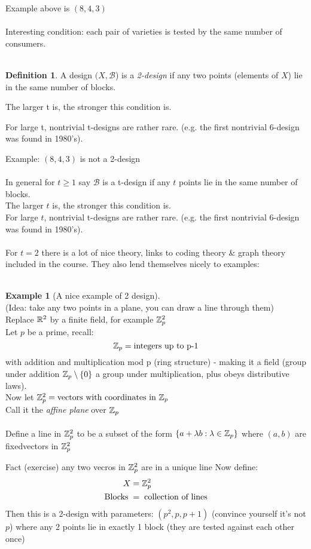 \documentclass[]{article}
\theoremstyle{definition}
\newtheorem*{defn}{Definition}
\newtheorem*{exmp}{Example}
\theoremstyle{remark}
\numberwithin{equation}{section}
\begin{document}
		Example above is $(8,4,3)$\\
		\\
		Interesting condition: each pair of varieties is tested by the same number of consumers.\\
		\\
		\begin{defn}
		A design $(X, \mathscr{B}$) is a \emph{2-design} if any two points (elements of $X$) lie in the same number of blocks.

		The larger t is, the stronger this condition is.

		For large t, nontrivial t-designs are rather rare.
		(e.g. the first nontrivial 6-design was found in 1980’s).
		\end{defn}
		Example: $(8,4,3)$ is not a 2-design\\
		\\
		In general for $t \geq 1$ say $\mathscr{B}$ is a t-design if any $t$ points lie in the same number of blocks.\\
		The larger $t$ is, the stronger this condition is.\\
		For large $t$, nontrivial t-designs are rather rare. (e.g. the first nontrivial 6-design was found in 1980’s).\\
		\\
		For $t = 2$ there is a lot of nice theory, links to coding theory \& graph theory included in the course. They also lend themselves nicely to examples:\\
		\\
		\begin{exmp}[A nice example of 2 design]\hfill\\
		(Idea: take any two points in a plane, you can draw a line through them)\\
		Replace $\mathbb R^2$ by a finite field, for example $\mathbb{Z}_p^2$\\
		Let $p$ be a prime, recall: \\
		\[
			\mathbb{Z}_p = \text{integers up to p-1}
		\]
		with addition and multiplication mod p (ring structure) - making it a field (group under addition $\mathbb{Z}_p\setminus\{0\}$ a group under multiplication, plus obeys distributive laws).\\

		Now let $\mathbb{Z}_p^2 = \text{vectors with coordinates in $\mathbb{Z}_p$}$\\
		Call it the \emph{affine plane} over $\mathbb{Z}_p$\\
		\\
		Define a line in $\mathbb{Z}_p^2$ to be a subset of the form  $\{a + \lambda b: \lambda \in \mathbb{Z}_p\}$
		where $(a,b)$ are fixedvectors in $\mathbb{Z}_p^2$

		Fact (exercise) any two vecros in $\mathbb{Z}_p^2$ are in a unique line
		Now define:
		\begin{align*}
			X &= \mathbb{Z}_p^2\\
			\text{Blocks}\; &= \;\text{collection of lines}
		\end{align*}
		 Then this is a 2-design with parameters: $(p^2, p, p+1)$ (convince yourself it’s not $p$) where any 2 points lie in exactly 1 block (they are tested against each other once)\\
		\end{exmp}
\end{document}
